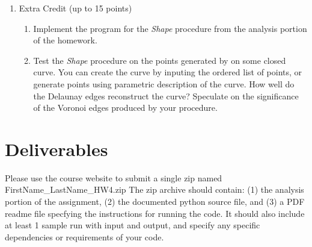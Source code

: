 \documentclass[11pt]{article}
\begin{document}
\begin{enumerate}
\begin{enumerate}
\end{enumerate}


\item Extra Credit (up to 15 points)
\begin{enumerate}
\item
Implement the program for the \emph{Shape} procedure from the analysis portion 
of the homework.
\item
Test the \emph{Shape} procedure on the points generated by on some closed curve.
You can create the curve by inputing the ordered list of points,  or generate 
points using parametric description of the curve.  How well do the Delaunay edges 
reconstruct the curve?   Speculate on the significance of the Voronoi edges 
produced by your procedure. 

\end{enumerate}


\end{enumerate}



\section*{Deliverables}

Please use the course website to submit a single  zip  named   FirstName\_LastName\_HW4.zip
The zip archive should contain:  (1) the analysis portion of the assignment,  (2)  the documented python source file, and (3) a PDF readme file  specfying the instructions for running the code.  It should also include at least 1 sample run with input and output,  and specify any specific dependencies or requirements of your code.  
\end{document}
